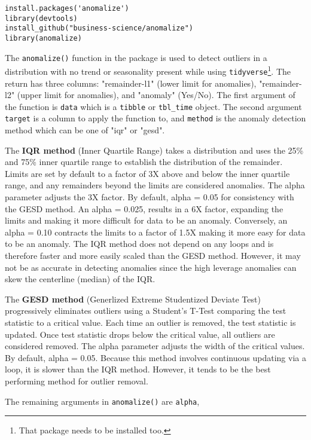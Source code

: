\begin{verbatim}
install.packages('anomalize')
library(devtools)
install_github("business-science/anomalize")
library(anomalize)
\end{verbatim}

The \verb|anomalize()| function in the package is used to detect outliers in a distribution with no trend or seasonality present while using \verb|tidyverse|\footnote{That package needs to be installed too.}. The return has three columns: "remainder-l1" (lower limit for anomalies), "remainder-l2" (upper limit for anomalies), and "anomaly" (Yes/No). The first argument of the function is \verb|data| which is a \verb|tibble| or \verb|tbl_time| object. The second argument \verb|target| is a column to apply the function to, and \verb|method| is the anomaly detection method which can be one of "iqr" or "gesd". 
\par The \textbf{IQR method} (Inner Quartile Range) takes a distribution and uses the 25\% and 75\% inner quartile range to establish the distribution of the remainder. Limits are set by default to a factor of 3X above and below the inner quartile range, and any remainders beyond the limits are considered anomalies. The alpha parameter adjusts the 3X factor. By default, alpha = 0.05 for consistency with the GESD method. An alpha = 0.025, results in a 6X factor, expanding the limits and making it more difficult for data to be an anomaly. Conversely, an alpha = 0.10 contracts the limits to a factor of 1.5X making it more easy for data to be an anomaly. The IQR method does not depend on any loops and is therefore faster and more easily scaled than the GESD method. However, it may not be as accurate in detecting anomalies since the high leverage anomalies can skew the centerline (median) of the IQR. \par The \textbf{GESD method} (Generlized Extreme Studentized Deviate Test) progressively eliminates outliers using a Student's T-Test comparing the test statistic to a critical value. Each time an outlier is removed, the test statistic is updated. Once test statistic drops below the critical value, all outliers are considered removed. The alpha parameter adjusts the width of the critical values. By default, alpha = 0.05. Because this method involves continuous updating via a loop, it is slower than the IQR method. However, it tends to be the best performing method for outlier removal. \par The remaining arguments in \verb|anomalize()| are \verb|alpha|, 
